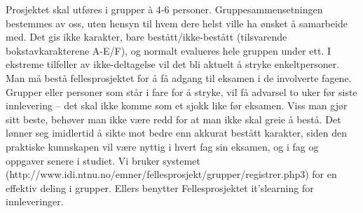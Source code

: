 \documentclass[a4paper]{scrartcl}
\begin{document}
Prosjektet skal utføres i grupper à 4-6 personer. Gruppesammensetningen bestemmes av oss, uten hensyn til hvem dere helst ville ha ønsket å samarbeide med. Det gis ikke karakter, bare bestått/ikke-bestått (tilsvarende bokstavkarakterene A-E/F), og normalt evalueres hele gruppen under ett. I ekstreme tilfeller av ikke-deltagelse vil det bli aktuelt å stryke enkeltpersoner. Man må bestå fellesprosjektet for å få adgang til eksamen i de involverte fagene. Grupper eller personer som står i fare for å stryke, vil få advarsel to uker før siste innlevering – det skal ikke komme som et sjokk like før eksamen. Viss man gjør sitt beste, behøver man ikke være redd for at man ikke skal greie å bestå. Det lønner seg imidlertid å sikte mot bedre enn akkurat bestått karakter, siden den praktiske kunnskapen vil være nyttig i hvert fag sin eksamen, og i fag og oppgaver senere i studiet.
Vi bruker systemet (http://www.idi.ntnu.no/emner/fellesprosjekt/grupper/registrer.php3) for en effektiv deling i grupper. Ellers benytter Fellesprosjektet it’slearning for innleveringer.
\end{document}
